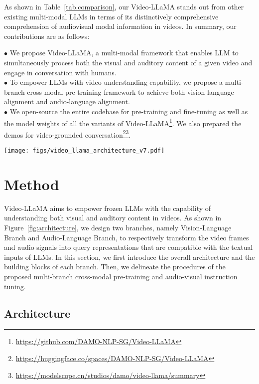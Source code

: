 \documentclass[11pt]{article}
\begin{document}
As shown in Table~\ref{tab.comparison}, our Video-LLaMA stands out from other existing multi-modal LLMs in terms of its distinctively comprehensive comprehension of audiovisual modal information in videos. In summary, our contributions are as follows:

\indent $\bullet$ We propose Video-LLaMA, a multi-modal framework that enables LLM to simultaneously process both the visual and auditory content of a given video and engage in conversation with humans.
\\ 
\indent $\bullet$ To empower LLMs with video understanding capability, we propose a multi-branch cross-modal pre-training framework to achieve both vision-language alignment and audio-language alignment. \\
\indent $\bullet$ We open-source the entire codebase for pre-training and fine-tuning as well as the model weights of all the variants of Video-LLaMA\footnote{\url{https://github.com/DAMO-NLP-SG/Video-LLaMA}}. We also prepared the demos for video-grounded conversation\footnote{\url{https://huggingface.co/spaces/DAMO-NLP-SG/Video-LLaMA}}\footnote{\url{https://modelscope.cn/studios/damo/video-llama/summary}}.
\begin{figure*}[ht]
    \centering
    \texttt{[image: figs/video\_llama\_architecture\_v7.pdf]}
    \caption{Overall architecture of Video-LLaMA.}
    \label{fig:architecture}
\end{figure*}




\section{Method}
Video-LLaMA aims to empower frozen LLMs with the capability of understanding both visual and auditory content in videos. As shown in Figure~\ref{fig:architecture}, we design two branches, namely Vision-Language Branch and Audio-Language Branch, to respectively transform the video frames and audio signals into query representations that are compatible with the textual inputs of LLMs. In this section, we first introduce the overall architecture and the building blocks of each branch. Then, we delineate the procedures of the proposed multi-branch cross-modal pre-training and audio-visual instruction tuning.

\subsection{Architecture}
\end{document}
